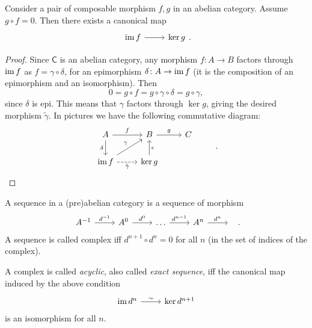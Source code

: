 \documentclass[../Main]{subfiles}
\begin{document}
\begin{rem}[]
	Consider a pair of composable morphism $f, g$ in an abelian category.
	Assume $g \circ f = 0$.
	Then there exists a canonical map
	\begin{equation}
	\begin{tikzcd}
		\ima f \arrow[r, "", rightarrow] &
		\ker g
	\end{tikzcd}
	.\end{equation} 
\end{rem}
\begin{proof}
	Since $\mathsf{C}$ is an abelian category,
	any morphism $f\colon A \to B$ factors through
	$\operatorname{im} f$ as $f = \gamma \circ \delta$,
	for an epimorphism $\delta\colon A \to \operatorname{im} f$
	(it is the composition of an epimorphism and an isomorphism).
	Then
	\begin{equation}
	0 = g \circ f = g \circ \gamma \circ \delta = g \circ \gamma
	,\end{equation} 
	since $\delta$ is epi.
	This means that $\gamma$ factors through $\ker g$, giving the desired
	morphism $\tilde{\gamma}$.
	In pictures we have the following commutative diagram:
	\begin{equation}
		\begin{tikzcd}
		A \arrow[r, "f", rightarrow] 
		\arrow[d, "\delta"', rightarrow] &
		B \arrow[r, "g", rightarrow] & 
		C\\
		\ima f \arrow[ru, "\gamma", rightarrow] 
		\arrow[r, "\tilde{\gamma}"', dashrightarrow] &
		\ker g \arrow[u, "\epsilon"', rightarrow] &
		&
	\end{tikzcd}
	\qedhere
	.\end{equation} 
\end{proof}

\begin{defn}[]
	A sequence in a (pre)abelian category
	is a sequence of morphism
	\begin{equation}
	\begin{tikzcd}
		A^{-1} \arrow[r, "d^{-1}", rightarrow] &
		A^0 \arrow[r, "d^0", rightarrow] &
		\dots \arrow[r, "d^{n-1}", rightarrow] &
		A^n \arrow[r, "d^n", rightarrow]  &
		\
	\end{tikzcd}
	.\end{equation} 
	A sequence is called complex iff $d^{n+1} \circ d^n = 0$ for all $n$
	(in the set of indices of the complex).

	A complex is called {\em acyclic}, also called {\em exact sequence},
	iff the canonical map induced by the above condition
	\begin{equation}
		\begin{tikzcd}
			\ima d^n \arrow[r, "\sim", rightarrow] &
			\ker d^{n+1}
		\end{tikzcd}
	\end{equation} 
	is an isomorphism for all $n$.
\end{defn}
\end{document}
